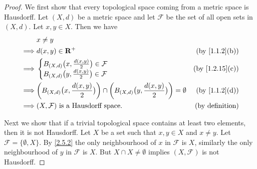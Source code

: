 \begin{proof}
  We first show that every topological space coming from a metric space is Hausdorff.
  Let \((X, d)\) be a metric space and let \(\mathcal{F}\) be the set of all open sets in \((X, d)\).
  Let \(x, y \in X\).
  Then we have
  \begin{align*}
             & x \neq y                                                                                                                                                 \\
    \implies & d(x, y) \in \R^+                                                                                                           & \text{(by \cref{1.1.2}(b))} \\
    \implies & \begin{cases}
                 B_{(X, d)}\big(x, \frac{d(x, y)}{2}\big) \in \mathcal{F} \\
                 B_{(X, d)}\big(y, \frac{d(x, y)}{2}\big) \in \mathcal{F}
               \end{cases}                                                          & \text{(by \cref{1.2.15}(c))}                                                      \\
    \implies & \bigg(B_{(X, d)}\big(x, \frac{d(x, y)}{2}\big)\bigg) \cap \bigg(B_{(X, d)}\big(y, \frac{d(x, y)}{2}\big)\bigg) = \emptyset & \text{(by \cref{1.1.2}(d))} \\
    \implies & (X, \mathcal{F}) \text{ is a Hausdorff space}.                                                                             & \text{(by definition)}
  \end{align*}

  Next we show that if a trivial topological space contains at least two elements, then it is not Hausdorff.
  Let \(X\) be a set such that \(x, y \in X\) and \(x \neq y\).
  Let \(\mathcal{F} = \{\emptyset, X\}\).
  By \cref{2.5.2} the only neighbourhood of \(x\) in \(\mathcal{F}\) is \(X\), similarly the only neighbourhood of \(y\) in \(\mathcal{F}\) is \(X\).
  But \(X \cap X \neq \emptyset\) implies \((X, \mathcal{F})\) is not Hausdorff.


\end{proof}
